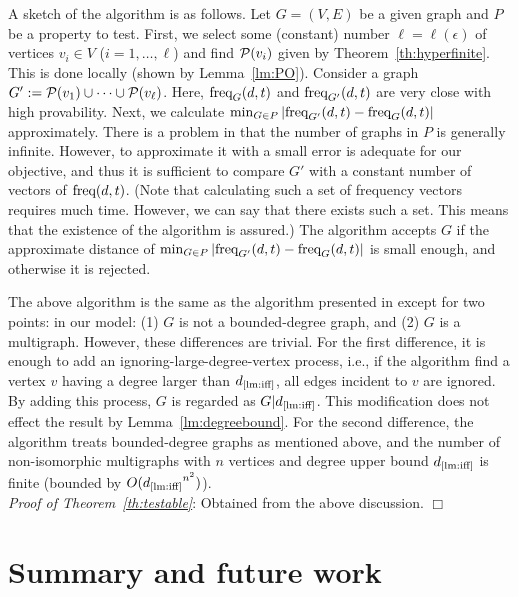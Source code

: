 \documentclass[11pt]{article}
\newcommand{\qed}{\hspace*{\fill} $\Box$}
\begin{document}
A sketch of the algorithm is as follows. 
Let $G=(V,E)$ be a given graph and 
$P$ be a property to test. 
First, we select some (constant) number $\ell = \ell (\epsilon)$ 
of vertices $v_i \in V$ ($i = 1, \ldots, \ell$) and 
find ${\cal P}(v_i)$ given by Theorem~\ref{th:hyperfinite}. 
This is done locally (shown by Lemma~\ref{lm:PO}).
Consider a graph 
$G' := {\cal P}(v_1) \cup \cdots \cup {\cal P}(v_{\ell})$. 
Here, $\mbox{\rm freq}_{G}(d,t)$ and $\mbox{\rm freq}_{G'}(d,t)$ 
are very close with high provability. 
Next, we calculate $\min_{G \in P}| \mbox{\rm freq}_{G'}(d,t) - \mbox{\rm freq}_{G}(d,t) |$ approximately. 
There is a problem in that the number of graphs in $P$ is generally 
infinite. However, to approximate it with a small error is 
adequate for our objective, and thus it is sufficient to compare $G'$ with 
a constant number of vectors of $\mbox{\rm freq}(d,t)$. 
(Note that calculating such a set of frequency vectors requires much time. 
However, we can say that there exists such a set.  
This means that the existence of the algorithm is assured.) 
The algorithm accepts $G$ 
if the approximate distance of 
$\min_{G \in P}| \mbox{\rm freq}_{G'}(d,t) - \mbox{\rm freq}_{G}(d,t) |$
is small enough, and otherwise it is rejected. 

The above algorithm is the same as the algorithm 
presented in \cite{NS_Testable_SJCOMP13} 
except for two points: in our model: 
(1) $G$ is not a bounded-degree graph, and 
(2) $G$ is a multigraph. 
However, these differences are trivial. 
For the first difference, it is enough to add an ignoring-large-degree-vertex process, 
i.e., if the algorithm find a vertex $v$ having a degree 
larger than $d_{\mbox{\rm \scriptsize \ref{lm:iff}}}$, 
all edges incident to $v$ are ignored.  
By adding this process, 
$G$ is regarded as $G|d_{\mbox{\rm \scriptsize \ref{lm:iff}}}$. 
This modification does not effect the result 
by Lemma~\ref{lm:degreebound}. 
For the second difference, 
the algorithm treats bounded-degree graphs as mentioned above, 
and the number of non-isomorphic multigraphs 
with $n$ vertices and degree upper bound 
$d_{\mbox{\rm \scriptsize \ref{lm:iff}}}$ is finite 
(bounded by 
$O({d_{\mbox{\rm \scriptsize \ref{lm:iff}}} }^{n^2})$). \\



\noindent
{\em Proof of Theorem~\ref{th:testable}}: 
Obtained from the above discussion. \qed



\section{Summary and future work}
\end{document}
